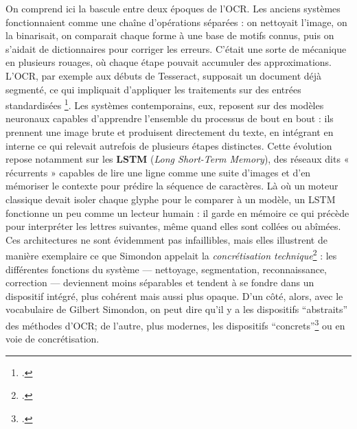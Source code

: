 On comprend ici la bascule entre deux époques de l’OCR. Les anciens systèmes fonctionnaient comme une chaîne d’opérations séparées : on nettoyait l’image, on la binarisait, on comparait chaque forme à une base de motifs connus, puis on s’aidait de dictionnaires pour corriger les erreurs. C’était une sorte de mécanique en plusieurs rouages, où chaque étape pouvait accumuler des approximations. L’OCR, par exemple aux débuts de Tesseract, supposait un document déjà segmenté, ce qui impliquait d’appliquer les traitements sur des entrées standardisées \footcite[][]{smith}. Les systèmes contemporains, eux, reposent sur des modèles neuronaux capables d’apprendre l’ensemble du processus de bout en bout : ils prennent une image brute et produisent directement du texte, en intégrant en interne ce qui relevait autrefois de plusieurs étapes distinctes. Cette évolution repose notamment sur les \textbf{LSTM} (\emph{Long Short-Term Memory}), des réseaux dits « récurrents » capables de lire une ligne comme une suite d’images et d’en mémoriser le contexte pour prédire la séquence de caractères. Là où un moteur classique devait isoler chaque glyphe pour le comparer à un modèle, un LSTM fonctionne un peu comme un lecteur humain : il garde en mémoire ce qui précède pour interpréter les lettres suivantes, même quand elles sont collées ou abîmées. Ces architectures ne sont évidemment pas infaillibles, mais elles illustrent de manière exemplaire ce que Simondon appelait la \emph{concrétisation technique}\footcite[][]{meot} : les différentes fonctions du système — nettoyage, segmentation, reconnaissance, correction — deviennent moins séparables et tendent à se fondre dans un dispositif intégré, plus cohérent mais aussi plus opaque. D'un côté, alors, avec le vocabulaire de Gilbert Simondon, on peut dire qu'il y a les dispositifs \enquote{abstraits} des méthodes d'OCR; de l'autre, plus modernes, les dispositifs \enquote{concrets}\footcite[][]{bontems} ou en voie de concrétisation.

